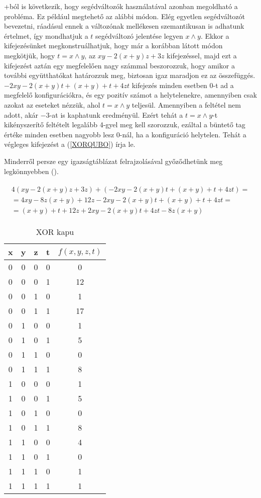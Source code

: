 \Az+ból is következik, hogy segédváltozók használatával azonban megoldható a probléma. Ez például megtehető az alábbi módon. Elég egyetlen segédváltozót bevezetni, ráadásul ennek a változónak mellékesen szemantikusan is adhatunk értelmet, így mondhatjuk a $t$ segédváltozó jelentése legyen $x \wedge y$.
Ekkor a kifejezésünket megkonstruálhatjuk, hogy már a korábban látott módon megkötjük, hogy $t = x \wedge y$, az $xy-2(x+y)z+3z$ kifejezéssel, majd ezt a kifejezést aztán egy megfelelően nagy számmal beszorozzuk, hogy amikor a további együtthatókat határozzuk meg, biztosan igaz maradjon ez az összefüggés. $-2xy-2(x+y)t+(x+y)+t+4zt$ kifejezés minden esetben $0$-t ad a megfelelő konfigurációkra, és egy pozitív számot a helytelenekre, amennyiben csak azokat az eseteket nézzük, ahol $t = x \wedge  y$ teljesül. Amennyiben a feltétel nem adott, akár $-3$-at is kaphatunk eredményül. Ezért tehát a $t = x \wedge  y$-t kikényszerítő feltételt legalább 4-gyel meg kell szorozzuk, ezáltal a büntető tag értéke minden esetben nagyobb lesz $0$-nál, ha a konfiguráció helytelen. Tehát a végleges kifejezést a (\ref{XORQUBO}) írja le.

Minderről persze egy igazságtáblázat felrajzolásával győződhetünk meg legkönnyebben ().


\begin{align}
\begin{split} \label{XORQUBO}
	4(xy-2(x+y)z+3z)+(-2xy-2(x+y)t+(x+y)+t+4zt) = \\
    = 4xy-8z(x+y)+12z-2xy-2(x+y)t+(x+y)+t+4zt = \\
	= (x+y)+t+12z+2xy-2(x+y)t+4zt-8z(x+y)	
\end{split}
\end{align}

\begin{table}[ht]
	\footnotesize
	\centering
	\begin{tabular}{ c c c c c }
		\toprule
		x & y & z & t & $f(x,y,z,t)$ \\
		\midrule
		0 & 0 & 0 & 0 & 0 \\
		0 & 0 & 0 & 1 & 12 \\
		0 & 0 & 1 & 0 & 1 \\
		0 & 0 & 1 & 1 & 17 \\
		0 & 1 & 0 & 0 & 1 \\
		0 & 1 & 0 & 1 & 5 \\
		0 & 1 & 1 & 0 & 0 \\
		0 & 1 & 1 & 1 & 8 \\		
		1 & 0 & 0 & 0 & 1 \\
		1 & 0 & 0 & 1 & 5 \\
		1 & 0 & 1 & 0 & 0 \\
		1 & 0 & 1 & 1 & 8 \\
		1 & 1 & 0 & 0 & 4 \\
		1 & 1 & 0 & 1 & 0 \\
		1 & 1 & 1 & 0 & 1 \\
		1 & 1 & 1 & 1 & 1 \\		
		\bottomrule
	\end{tabular}
	\caption{XOR kapu}
	\label{tab:XORgate}
\end{table}

